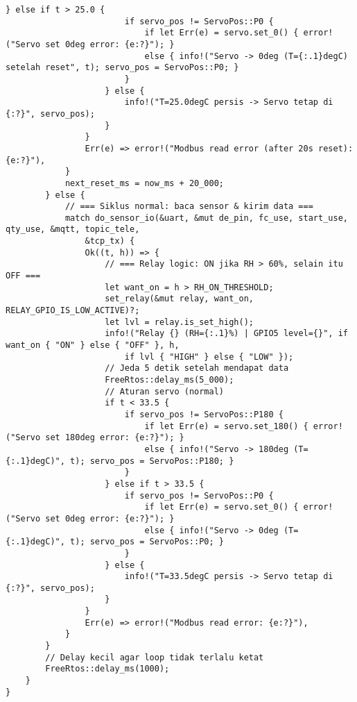 \documentclass[a4paper, 12pt]{article}
\begin{document}
\begin{lstlisting}[style=ruststyle, caption={main.rs}, basicstyle=\ttfamily\tiny]
                    } else if t > 25.0 {
                        if servo_pos != ServoPos::P0 {
                            if let Err(e) = servo.set_0() { error!("Servo set 0deg error: {e:?}"); }
                            else { info!("Servo -> 0deg (T={:.1}degC) setelah reset", t); servo_pos = ServoPos::P0; }
                        }
                    } else {
                        info!("T=25.0degC persis -> Servo tetap di {:?}", servo_pos);
                    }
                }
                Err(e) => error!("Modbus read error (after 20s reset): {e:?}"),
            }
            next_reset_ms = now_ms + 20_000;
        } else {
            // === Siklus normal: baca sensor & kirim data ===
            match do_sensor_io(&uart, &mut de_pin, fc_use, start_use, qty_use, &mqtt, topic_tele,
                &tcp_tx) {
                Ok((t, h)) => {
                    // === Relay logic: ON jika RH > 60%, selain itu OFF ===
                    let want_on = h > RH_ON_THRESHOLD;
                    set_relay(&mut relay, want_on, RELAY_GPIO_IS_LOW_ACTIVE)?;
                    let lvl = relay.is_set_high();
                    info!("Relay {} (RH={:.1}%) | GPIO5 level={}", if want_on { "ON" } else { "OFF" }, h,
                        if lvl { "HIGH" } else { "LOW" });
                    // Jeda 5 detik setelah mendapat data
                    FreeRtos::delay_ms(5_000);
                    // Aturan servo (normal)
                    if t < 33.5 {
                        if servo_pos != ServoPos::P180 {
                            if let Err(e) = servo.set_180() { error!("Servo set 180deg error: {e:?}"); }
                            else { info!("Servo -> 180deg (T={:.1}degC)", t); servo_pos = ServoPos::P180; }
                        }
                    } else if t > 33.5 {
                        if servo_pos != ServoPos::P0 {
                            if let Err(e) = servo.set_0() { error!("Servo set 0deg error: {e:?}"); }
                            else { info!("Servo -> 0deg (T={:.1}degC)", t); servo_pos = ServoPos::P0; }
                        }
                    } else {
                        info!("T=33.5degC persis -> Servo tetap di {:?}", servo_pos);
                    }
                }
                Err(e) => error!("Modbus read error: {e:?}"),
            }
        }
        // Delay kecil agar loop tidak terlalu ketat
        FreeRtos::delay_ms(1000);
    }
}
\end{lstlisting}
\end{document}
